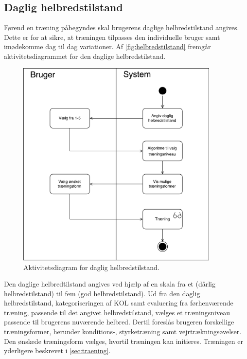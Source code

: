 \subsection{Daglig helbredstilstand}
Førend en træning påbegyndes skal brugerens daglige helbredstilstand angives. Dette er for at sikre, at træningen tilpasses den individuelle bruger samt imødekomme dag til dag variationer. Af \autoref{fig:helbredstilstand} fremgår aktivitetsdiagrammet for den daglige helbredstilstand. 

\begin{figure} [H]
\centering
\includegraphics[width=0.9\textwidth]{figures/aktivitetsdiagram/Helbredstilstand}
\caption{Aktivitetsdiagram for daglig helbredstilstand.}
\label{fig:helbredstilstand}
\end{figure}

\noindent
Den daglige helbredtilstand angives ved hjælp af en skala fra et (dårlig helbredstilstand) til fem (god helbredstilstand). Ud fra den daglig helbredstilstand, kategoriseringen af KOL samt evaluering fra førhenværende træning, passende til det angivet helbredstilstand, vælges et træningsniveau passende til brugerens nuværende helbred. Dertil foreslås brugeren forskellige træningsformer, herunder konditions-, styrketræning samt vejrtrækningsøvelser. Den ønskede træningsform vælges, hvortil træningen kan initieres. Træningen er yderligere beskrevet i \autoref{sec:traening}. 
